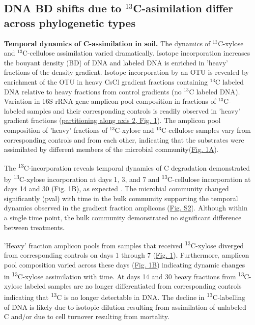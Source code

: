 \subsection{DNA BD shifts due to $^{13}$C-asimilation differ across phylogenetic types}
\textbf{Temporal dynamics of C-assimilation in soil.}  
The dynamics of $^{13}$C-xylose and $^{13}$C-cellulose assimilation varied
dramatically. Isotope incorporation increases the bouyant density (BD) of DNA
and labeled DNA is enriched in 'heavy' fractions of the density gradient.
Isotope incorporation by an OTU is revealed by enrichment of the OTU in heavy
CsCl gradient fractions containing $^{13}$C labeled DNA relative to heavy
fractions from control gradients (no $^{13}$C labeled DNA). Variation in 16S
rRNA gene amplicon pool composition in fractions of $^{13}$C-labeled samples
and their corresponding controls is readily observed in 'heavy' gradient
fractions
(\href{https://www.authorea.com/users/3537/articles/3612/master/file/figures/ordination_all1/ordination_all1.png}{partitioning
along axis 2, Fig. 1}). The amplicon pool composition of 'heavy' fractions of
$^{13}$C-xylose and $^{13}$C-cellulose samples vary from corresponding controls
and from each other, indicating that the substrates were assimilated by
different members of the  microbial
community(\href{https://www.authorea.com/users/3537/articles/3612/master/file/figures/ordination_all1/ordination_all1.png}{Fig.
1A}).

The \textsuperscript{13}C-incorporation reveals temporal dynamics of C
degradation demonstrated by \textsuperscript{13}C-xylose incorporation at days
1, 3, and 7 and \textsuperscript{13}C-cellulose incorporation at days 14 and 30
(\href{https://www.authorea.com/users/3537/articles/3612/master/file/figures/ordination_all1/ordination_all1.png}{Fig.
1B}), as expected \cite{Amelung_2008}. The microbial community changed
significantly (pval) with time in the bulk community supporting the temporal
dynamics observed in the gradient fraction amplicons
(\href{https://authorea.com/users/3537/articles/8459/master/file/figures/bulk_ordination/bulk_ordination.png}{Fig.
S2}). Although within a single time point, the bulk community demonstrated no
significant difference between treatments. 

'Heavy' fraction amplicon pools from samples that received
\textsuperscript{13}C-xylose diverged from corresponding controls on days 1
through 7
(\href{https://www.authorea.com/users/3537/articles/3612/master/file/figures/ordination_all1/ordination_all1.png}{Fig.
1}). Furthermore, amplicon pool composition varied across these days
(\href{https://www.authorea.com/users/3537/articles/3612/master/file/figures/ordination_all1/ordination_all1.png}{Fig.
1B}) indicating dynamic changes in \textsuperscript{13}C-xylose assimilation
with time. At days 14 and 30 heavy fractions from \textsuperscript{13}C-xylose
labeled samples are no longer differentiated from corresponding controls
indicating that \textsuperscript{13}C is no longer detectable in DNA. The
decline in \textsuperscript{13}C-labelling of DNA is likely due to isotopic
dilution resulting from assimilation of unlabeled C and/or due to cell turnover
resulting from mortality. 

